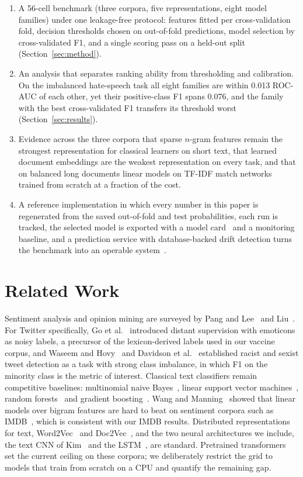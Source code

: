 \documentclass[journal,10pt]{IEEEtran}
\begin{document}
\begin{enumerate}
\item A 56-cell benchmark (three corpora, five representations, eight model families) under one leakage-free protocol: features fitted per cross-validation fold, decision thresholds chosen on out-of-fold predictions, model selection by cross-validated F1, and a single scoring pass on a held-out split (Section~\ref{sec:method}).
\item An analysis that separates ranking ability from thresholding and calibration. On the imbalanced hate-speech task all eight families are within 0.013 ROC-AUC of each other, yet their positive-class F1 spans 0.076, and the family with the best cross-validated F1 transfers its threshold worst (Section~\ref{sec:results}).
\item Evidence across the three corpora that sparse $n$-gram features remain the strongest representation for classical learners on short text, that learned document embeddings are the weakest representation on every task, and that on balanced long documents linear models on TF-IDF match networks trained from scratch at a fraction of the cost.
\item A reference implementation in which every number in this paper is regenerated from the saved out-of-fold and test probabilities, each run is tracked, the selected model is exported with a model card~\cite{mitchell2019} and a monitoring baseline, and a prediction service with database-backed drift detection turns the benchmark into an operable system~\cite{sculley2015}.
\end{enumerate}

\section{Related Work}
Sentiment analysis and opinion mining are surveyed by Pang and Lee~\cite{pang2008} and Liu~\cite{liu2012}. For Twitter specifically, Go et al.~\cite{go2009} introduced distant supervision with emoticons as noisy labels, a precursor of the lexicon-derived labels used in our vaccine corpus, and Waseem and Hovy~\cite{waseem2016} and Davidson et al.~\cite{davidson2017} established racist and sexist tweet detection as a task with strong class imbalance, in which F1 on the minority class is the metric of interest. Classical text classifiers remain competitive baselines: multinomial naive Bayes~\cite{mccallum1998}, linear support vector machines~\cite{joachims1998}, random forests~\cite{breiman2001} and gradient boosting~\cite{chen2016}. Wang and Manning~\cite{wang2012} showed that linear models over bigram features are hard to beat on sentiment corpora such as IMDB~\cite{maas2011}, which is consistent with our IMDB results. Distributed representations for text, Word2Vec~\cite{mikolov2013} and Doc2Vec~\cite{le2014}, and the two neural architectures we include, the text CNN of Kim~\cite{kim2014} and the LSTM~\cite{hochreiter1997}, are standard. Pretrained transformers~\cite{devlin2019} set the current ceiling on these corpora; we deliberately restrict the grid to models that train from scratch on a CPU and quantify the remaining gap.
\end{document}
